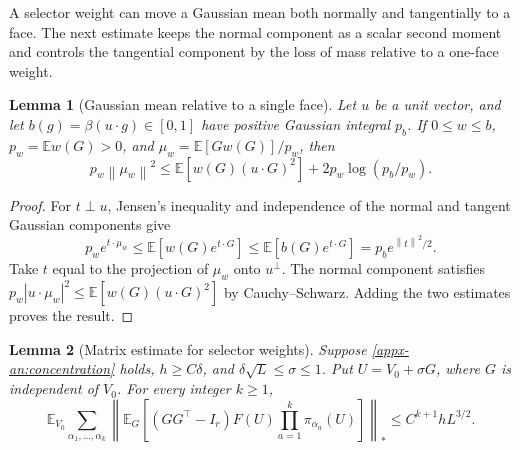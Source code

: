 \documentclass[11pt,letterpaper]{article}
\newtheorem{lemma}{Lemma}
\theoremstyle{remark}
\newcommand{\E}{\mathbb E}
\newcommand{\norm}[1]{\left\lVert#1\right\rVert}
\begin{document}
A selector weight can move a Gaussian mean both normally and tangentially
to a face. The next estimate keeps the normal component as a scalar second
moment and controls the tangential component by the loss of mass relative
to a one-face weight.

\begin{lemma}[Gaussian mean relative to a single face]
\label{appx-an:lem:mean}
Let \(u\) be a unit vector, and let
\(b(g)=\beta(u\cdot g)\in[0,1]\) have positive Gaussian integral
\(p_b\).  If \(0\le w\le b\), \(p_w=\E w(G)>0\), and
\(\mu_w=\E[Gw(G)]/p_w\), then
\begin{equation}
 p_w\norm{\mu_w}^2
 \le \E[w(G)(u\cdot G)^2]
        +2p_w\log(p_b/p_w).
 \label{appx-an:mean-entropy}
\end{equation}
\end{lemma}

\begin{proof}
For \(t\perp u\), Jensen's inequality and independence of the
normal and tangent Gaussian components give
\[
 p_we^{t\cdot\mu_w}
 \le\E[w(G)e^{t\cdot G}]
 \le\E[b(G)e^{t\cdot G}]
 =p_be^{\norm{t}^2/2}.
\]
Take \(t\) equal to the projection of \(\mu_w\) onto \(u^\perp\).
The normal component satisfies
\(p_w|u\cdot\mu_w|^2\le\E[w(G)(u\cdot G)^2]\) by
Cauchy--Schwarz.  Adding the two estimates proves the result.
\end{proof}

\begin{lemma}[Matrix estimate for selector weights]
\label{appx-an:lem:matrix}
Suppose \eqref{appx-an:concentration} holds, \(h\ge C\delta\), and
\(\delta\sqrt L\le\sigma\le1\).  Put \(U=V_0+\sigma G\),
where \(G\) is independent of \(V_0\).  For every integer \(k\ge1\),
\begin{equation}
 \E_{V_0}\sum_{\alpha_1,\ldots,\alpha_k}
 \left\|\E_G\left[(GG^\top-I_r)F(U)
                \prod_{a=1}^k\pi_{\alpha_a}(U)\right]\right\|_*
 \le C^{k+1}hL^{3/2}.
 \label{appx-an:matrix-bound}
\end{equation}
\end{lemma}
\end{document}
